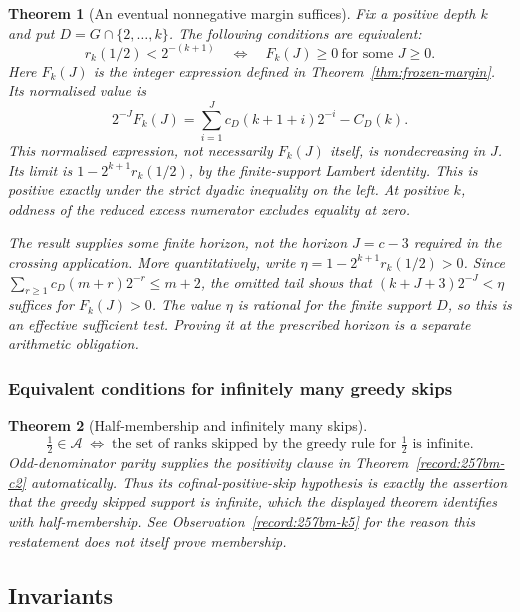 \documentclass[11pt]{article}
\theoremstyle{plain}
\newtheorem{thm}{Theorem}[section]
\theoremstyle{definition}
\theoremstyle{remark}
\begin{document}
\begin{thm}[An eventual nonnegative margin suffices]\label{record:257bm-c19}
Fix a positive depth $k$ and put $D=G\cap\{2,\ldots,k\}$.
The following conditions are equivalent:
\[
 r_k(1/2)<2^{-(k+1)}
 \quad\Longleftrightarrow\quad
 F_k(J)\ge0\ \text{for some }J\ge0.
\]
Here $F_k(J)$ is the integer expression defined in
Theorem~\ref{thm:frozen-margin}.  Its normalised value is
\[
 2^{-J}F_k(J)=\sum_{i=1}^{J}c_D(k+1+i)2^{-i}-C_D(k).
\]
This normalised expression, not necessarily $F_k(J)$ itself, is
nondecreasing in $J$.  Its limit is
$1-2^{k+1}r_k(1/2)$, by the finite-support Lambert identity.
This is positive exactly under the strict dyadic inequality on the left.  At positive $k$, oddness of the
reduced excess numerator excludes equality at zero.

The result supplies some finite horizon, not the horizon $J=c-3$
required in the crossing application.  More quantitatively, write
$\eta=1-2^{k+1}r_k(1/2)>0$.  Since
$\sum_{r\ge1}c_D(m+r)2^{-r}\le m+2$, the omitted tail shows that
$(k+J+3)2^{-J}<\eta$ suffices for $F_k(J)>0$.
The value $\eta$ is rational for the finite support $D$, so this is an
effective sufficient test.  Proving it at the prescribed horizon is a
separate arithmetic obligation.
\end{thm}

\subsubsection*{Equivalent conditions for infinitely many greedy skips}

\begin{thm}[Half-membership and infinitely many skips]\label{record:257bm-c20}
\[
\tfrac12\in\ensuremath{\mathcal A} \;\Longleftrightarrow\; \text{the set of ranks skipped by the greedy rule for }\tfrac12\text{ is infinite}.
\]
Odd-denominator parity supplies the positivity clause in Theorem~\ref{record:257bm-c2} automatically. Thus its
cofinal-positive-skip hypothesis is exactly the assertion that the greedy skipped support is
infinite, which the displayed theorem identifies with half-membership. See Observation~\ref{record:257bm-k5} for the
reason this restatement does not itself prove membership.
\end{thm}

\subsection{Invariants}
\end{document}
